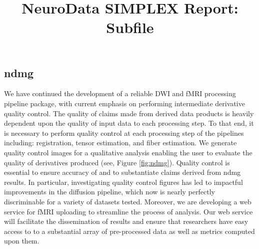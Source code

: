 \documentclass[simplex.tex]{subfiles}
\title{NeuroData SIMPLEX Report: Subfile}
\begin{document}


\subsection{ndmg}

We have continued the development of a reliable DWI and fMRI processing pipeline
package, with current emphasis on performing intermediate derivative quality
control. The quality of claims made from derived data products is heavily
dependent upon the quality of input data to each processing step. To that end,
it is necessary to perform quality control at each processing step of the
pipelines including: registration, tensor estimation, and fiber estimation. We
generate quality control images for a qualitative analysis enabling the user to
evaluate the quality of derivatives produced (see, Figure \ref{fig:ndmg}). Quality
control is essential to ensure accuracy of and to substantiate claims derived
from ndmg results. In particular, investigating quality control figures has led
to impactful improvements in the diffusion pipeline, which now is nearly
perfectly discriminable for a variety of datasets tested. Moreover, we are
developing a web service for fMRI uploading to streamline the process of
analysis. Our web service will facilitate the dissemination of results and
ensure that researchers have easy access to to a substantial array of
pre-processed data as well as metrics computed upon them.
\end{document}
